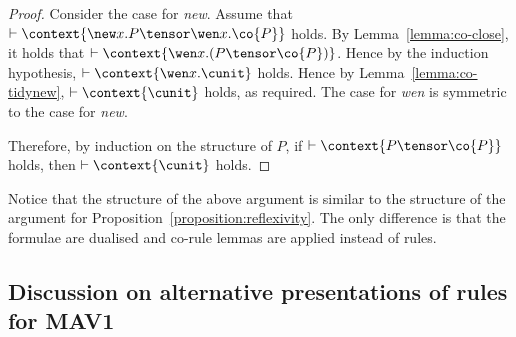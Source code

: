 \documentclass[UKenglish,acmsmall,authorversion]{acmart}
\theoremstyle{plain}
\begin{document}
{\begin{proof}
Consider the case for \textit{new}.
Assume that $\vdash \context{ \new x. P \tensor \wen x. \co{P} }$ holds.
By Lemma~\ref{lemma:co-close}, it holds that $\vdash \context{ \mathopen{\wen x.} \left( P \tensor \co{P} \right) }$.
Hence by the induction hypothesis, $\vdash \context{ \wen x. \cunit }$ holds.
Hence by Lemma~\ref{lemma:co-tidynew}, $\vdash \context{ \cunit }$ holds, as required.
The case for \textit{wen} is symmetric to the case for \textit{new}.

Therefore, by induction on the structure of $P$, if $\vdash \context{ P \tensor \co{P} }$ holds, then $\vdash \context{ \cunit }$ holds.
\end{proof}
}{}

Notice that the structure of the above argument is similar to the structure of the argument for Proposition~\ref{proposition:reflexivity}.
The only difference is that the formulae are dualised and co-rule lemmas are applied instead of rules.
\subsection{Discussion on alternative presentations of rules for \textsf{MAV1}}
\end{document}
